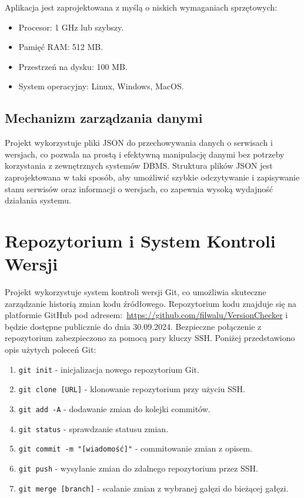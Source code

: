 Aplikacja jest zaprojektowana z myślą o niskich wymaganiach sprzętowych:

\begin{itemize}
\item Procesor: 1 GHz lub szybszy.
\item Pamięć RAM: 512 MB.
\item Przestrzeń na dysku: 100 MB.
\item System operacyjny: Linux, Windows, MacOS.
\end{itemize}

\subsection{Mechanizm zarządzania danymi}

Projekt wykorzystuje pliki JSON do przechowywania danych o serwisach i wersjach, co pozwala na prostą i efektywną manipulację danymi bez potrzeby korzystania z zewnętrznych systemów DBMS. Struktura plików JSON jest zaprojektowana w taki sposób, aby umożliwić szybkie odczytywanie i zapisywanie stanu serwisów oraz informacji o wersjach, co zapewnia wysoką wydajność działania systemu.

\section{Repozytorium i System Kontroli Wersji}

Projekt wykorzystuje system kontroli wersji Git, co umożliwia skuteczne zarządzanie historią zmian kodu źródłowego. Repozytorium kodu znajduje się na platformie GitHub pod adresem:\ \url{https://github.com/filwalu/VersionChecker} i będzie dostępne publicznie do dnia 30.09.2024. Bezpieczne połączenie z repozytorium zabezpieczono za pomocą pary kluczy SSH. Poniżej przedstawiono opis użytych poleceń Git:

\begin{enumerate}
\item \texttt{git init} - inicjalizacja nowego repozytorium Git.
\item \texttt{git clone [URL]} - klonowanie repozytorium przy użyciu SSH.
\item \texttt{git add -A} - dodawanie zmian do kolejki commitów.
\item \texttt{git status} - sprawdzanie statusu zmian.
\item \texttt{git commit -m "[wiadomość]"} - commitowanie zmian z opisem.
\item \texttt{git push} - wysyłanie zmian do zdalnego repozytorium przez SSH.
\item \texttt{git merge [branch]} - scalanie zmian z wybranej gałęzi do bieżącej gałęzi.
\end{enumerate}

\clearpage